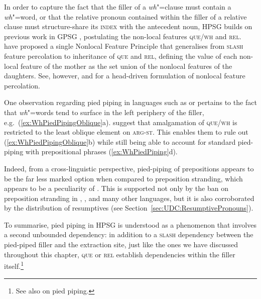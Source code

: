 \documentclass[output=paper
,notxmath 
 	        ,biblatex
                ,babelshorthands
                ,newtxmath
                ,draftmode
                ,colorlinks, citecolor=brown
]{langscibook}
\begin{document}
\noindent
In order to capture the fact that the filler of a \emph{wh}"=clause
must contain a \emph{wh}"=word, or that the relative pronoun contained
within the filler of a relative clause must structure-share its
\textsc{index} with the antecedent noun, HPSG builds on previous work
in GPSG \citep[Chapter~5.2]{Gazdar85}, postulating the non-local features
\textsc{que}/\textsc{wh} and \textsc{rel}. \citet[]{Pollard:Sag:94} have proposed
a single Nonlocal Feature Principle that generalises from
\textsc{slash} feature percolation to inheritance of \textsc{que} and
\textsc{rel}, defining the value of each non-local feature of the
mother as the set union of the nonlocal features of the
daughters. See, however, \citet[Section~4.2]{Sag:97} and
\citet[Chapter~7]{Ginzburg:Sag:01} for a head-driven formulation of nonlocal feature percolation.

One observation regarding pied piping in languages such as  or
 pertains to the fact that \emph{wh}"=words tend to surface in
the left periphery of the filler, e.g.~(\ref{ex:WhPiedPipingOblique}a). \citet[194,~fn.~26]{Ginzburg:Sag:01} suggest that
amalgamation of \textsc{que/wh} is restricted to the least oblique
element on \textsc{arg-st}. This enables them to rule out
(\ref{ex:WhPiedPipingOblique}b) while still being able to account for
standard pied-piping with prepositional phrases
(\ref{ex:WhPiedPiping}d).

\begin{exe}
  \ex \label{ex:WhPiedPipingOblique}
  \begin{xlist}
  \end{xlist}
\end{exe}

\noindent
Indeed, from a cross-linguistic perspective, pied-piping of
prepositions appears to be the far less marked option when compared to
preposition stranding, which appears to be a peculiarity of
 \citep[cf.][]{Riemsdijk78a}. This is supported not only by the ban on preposition
stranding in , , and many other languages, but it is also
corroborated by the distribution of resumptives (see Section~\ref{sec:UDC:ResumptivePronouns}).

To summarise, pied piping in HPSG is understood as a phenomenon that
involves a second unbounded dependency: in addition to a
\textsc{slash} dependency between the pied-piped filler and the
extraction site, just like the ones we have discussed throughout this
chapter, \textsc{que} or \textsc{rel} establish dependencies within
the filler itself.\footnote{
See also  on pied
  piping.
}
\end{document}
